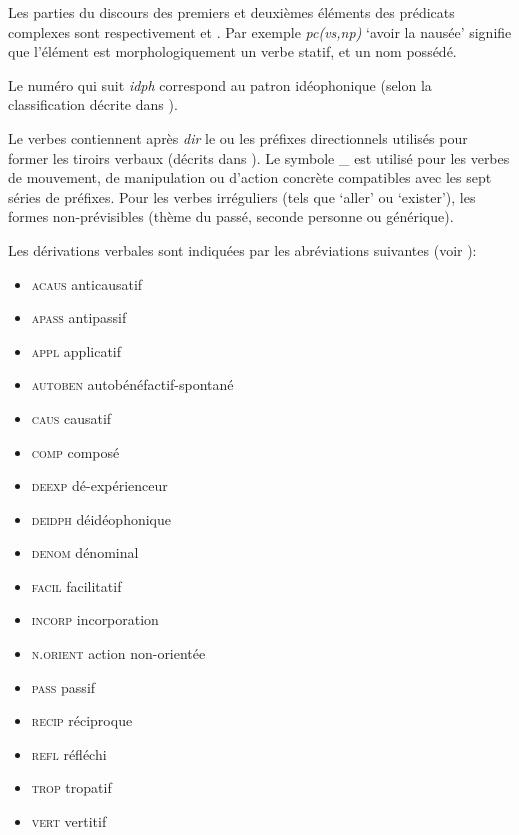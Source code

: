 Les parties du discours des premiers et deuxièmes éléments des prédicats complexes sont respectivement  et . Par exemple  \textit{pc(vs,np)} `avoir la nausée' signifie que l'élément  est morphologiquement un verbe statif, et  un nom possédé.

Le numéro qui suit \textit{idph} correspond au patron idéophonique (selon la classification décrite dans \citealt{japhug14ideophones}).

Le verbes contiennent après \textit{dir} le ou les préfixes directionnels utilisés pour former les tiroirs verbaux (décrits dans \citealt[267-9]{jacques14linking}). Le symbole \_  est utilisé pour les verbes de mouvement, de manipulation ou d'action concrète compatibles avec les sept séries de préfixes. Pour les verbes irréguliers (tels que  `aller' ou   `exister'), les formes non-prévisibles (thème du passé, seconde personne ou générique). 

Les dérivations verbales sont indiquées par les abréviations suivantes (voir \citealt{jacques12incorp, jacques13tropative, jacques14antipassive,  jacques15spontaneous, jacques15causative}):

\begin{itemize}
\item \textsc{acaus} anticausatif 
\item \textsc{apass} antipassif
\item \textsc{appl} applicatif
\item \textsc{autoben} autobénéfactif-spontané
\item \textsc{caus} causatif 
\item \textsc{comp} composé
\item \textsc{deexp} dé-expérienceur
\item \textsc{deidph} déidéophonique
\item \textsc{denom} dénominal
\item \textsc{facil} facilitatif
\item \textsc{incorp} incorporation
\item \textsc{n.orient} action non-orientée
\item \textsc{pass} passif
\item \textsc{recip} réciproque
\item \textsc{refl} réfléchi
\item \textsc{trop} tropatif
\item \textsc{vert} vertitif
\end{itemize}

